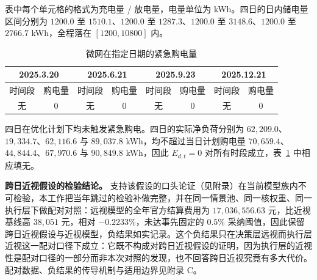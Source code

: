表中每个单元格的格式为充电量 / 放电量，电量单位为 kWh。四日的日内储电量区间分别为 $1200.0$ 至 $1510.1$、$1200.0$ 至 $1287.3$、$1200.0$ 至 $3148.6$、$1200.0$ 至 $2766.7$ kWh，全程落在 $[1200,10800]$ 内。

\begin{table}[htbp]
\centering
\caption{微网在指定日期的紧急购电量}
\label{tab:emergency2}
\small
\setlength{\tabcolsep}{5pt}
\renewcommand{\arraystretch}{1.2}
\begin{tabular}{cccccccc}
\toprule
\multicolumn{2}{c}{2025.3.20} & \multicolumn{2}{c}{2025.6.21} & \multicolumn{2}{c}{2025.9.23} & \multicolumn{2}{c}{2025.12.21} \\
\midrule
时间段 & 购电量 & 时间段 & 购电量 & 时间段 & 购电量 & 时间段 & 购电量 \\
\midrule
无 & 0 & 无 & 0 & 无 & 0 & 无 & 0 \\
\bottomrule
\end{tabular}
\end{table}

四日在优化计划下均未触发紧急购电。四日的实际净负荷分别为 $62{,}209.0$、$19{,}334.7$、$62{,}116.6$ 与 $89{,}037.8$ kWh，均不超过当日计划购电量 $70{,}659.4$、$44{,}844.4$、$67{,}970.6$ 与 $90{,}849.8$ kWh，因此 $E_{d,t}=0$ 对所有时段成立，表~\ref{tab:emergency2} 中相应填无。

\textbf{跨日近视假设的检验结论。} 支持该假设的口头论证（见附录）在当前模型族内不可检验，本工作把当年跳过的检验补做完整，并在同一情景池、同一核权重、同一执行层下做配对对照：远视模型的全年官方结算费用为 $17{,}036{,}556.63$ 元，比近视基线高 $38{,}051$ 元，相对 $-0.2233\%$，未达事先固定的 $0.5\%$ 采纳阈值，因此保留跨日近视假设与近视模型，负结果如实记录。这个负结果只在决策层远视而执行层近视这一配对口径下成立：它既不构成对跨日近视假设的证明，因为执行层的近视性是配对口径的一部分而非本次对照的发现，也不回答跨日近视究竟有多大代价。配对数据、负结果的传导机制与适用边界见附录 C。

